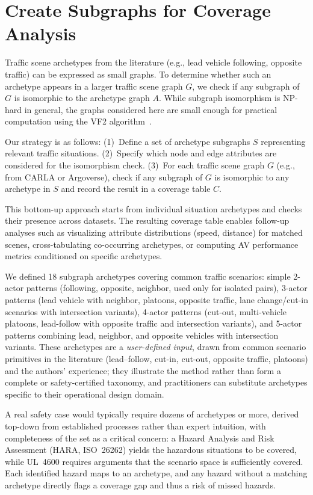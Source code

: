 \section{Create Subgraphs for Coverage Analysis}
\label{chapter:create_subgraphs_for_coverage_analysis}

Traffic scene archetypes from the literature (e.g., lead vehicle following, opposite traffic) can be expressed as small graphs. To determine whether such an archetype appears in a 
larger traffic scene graph $G$, we check if any subgraph of $G$ is isomorphic to the archetype graph $A$. While subgraph isomorphism is NP-hard in general, 
the graphs considered here are small enough for practical computation using the VF2 algorithm~\cite{cordella2004subgraph}.

Our strategy is as follows: (1)~Define a set of archetype subgraphs $S$ representing relevant traffic situations. (2)~Specify which node and edge attributes are considered for the isomorphism check. (3)~For each traffic scene graph $G$ (e.g., from CARLA or Argoverse), check if any subgraph of $G$ is isomorphic to any archetype in $S$ and record the result in a coverage table $C$.

This bottom-up approach starts from individual situation archetypes and checks their presence across datasets. The resulting coverage table enables follow-up analyses such as visualizing attribute distributions (speed, distance) for matched scenes, cross-tabulating co-occurring archetypes, or computing AV performance metrics conditioned on specific archetypes.

We defined 18 subgraph archetypes covering common traffic scenarios: simple 2-actor patterns (following, opposite, neighbor, used only for isolated pairs), 3-actor patterns (lead vehicle with neighbor, platoons, opposite traffic, lane change/cut-in scenarios with intersection variants), 
4-actor patterns (cut-out, multi-vehicle platoons, lead-follow with opposite traffic and intersection variants), and 5-actor patterns combining lead, neighbor, and opposite vehicles with intersection variants. These archetypes are a \emph{user-defined input}, drawn from common scenario primitives in the literature (lead--follow, cut-in, cut-out, opposite traffic, platoons) and the authors' experience; they illustrate the method rather than form a complete or safety-certified taxonomy, and practitioners can substitute archetypes specific to their operational design domain.

A real safety case would typically require dozens of archetypes or more, derived top-down from established processes rather than expert intuition, with completeness of the set as a critical concern: a Hazard Analysis and Risk Assessment (HARA, ISO~26262) yields the hazardous situations to be covered, while UL~4600 requires arguments that the scenario space is sufficiently covered. Each identified hazard maps to an archetype, and any hazard without a matching archetype directly flags a coverage gap and thus a risk of missed hazards.

